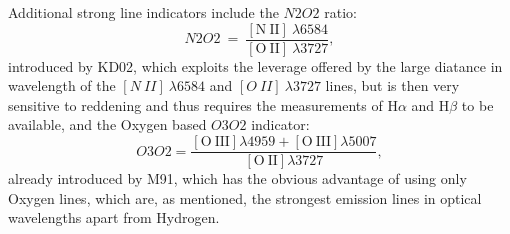 \documentclass{emulateapj}
\newcommand{\oxabinline}{\ensuremath{12 + \log_{10}(\mathrm{O}/\mathrm{H})}}
\newcommand{\ha}{\ensuremath{\mathrm{H}\alpha}}
\newcommand{\hb}{\ensuremath{\mathrm{H}\beta}}
\begin{document}
Additional strong line indicators include the $N2O2$ ratio:
$$N2O2 ~=~ \frac{[\mathrm{N~II}]~\lambda 6584}{[\mathrm{O~II}]~\lambda 3727},$$
introduced by KD02, which exploits the leverage offered by the large
diatance in wavelength of the $[N~II]~\lambda 6584$ and
$[O~II]~\lambda3727$ lines, but is then very sensitive to reddening
and thus requires the measurements of $\ha$ and $\hb$ to be available,
and the Oxygen based $O3O2$ indicator:
$$O3O2=\frac{\mathrm{[O~III]}\lambda4959+\mathrm{[O~III]}\lambda5007}{\mathrm{[O~II]}\lambda3727},$$
already introduced by M91, which has the obvious advantage of using
only Oxygen lines, which are, as mentioned, the strongest emission
lines in optical wavelengths apart from Hydrogen.
 
\end{document}
